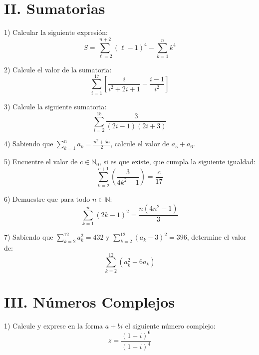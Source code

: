 \documentclass[letterpaper, 12pt]{article}
\newenvironment{ejercicios}{}{}
\begin{document}
\begin{ejercicios}
\vspace{1cm}

\newpage
\thispagestyle{fancy}
\section*{II. Sumatorias}

1) Calcular la siguiente expresión:
$$ S = \sum_{\ell=2}^{n+2} (\ell - 1)^4 - \sum_{k=1}^n k^4 $$

\vspace{0.5cm}

2) Calcule el valor de la sumatoria:
$$ \sum_{i=1}^{17} \left[ \frac{i}{i^2 + 2i + 1} - \frac{i - 1}{i^2} \right] $$

\vspace{0.5cm}

3) Calcule la siguiente sumatoria:
$$ \sum_{i=2}^{15} \frac{3}{(2i - 1)(2i + 3)} $$

\vspace{0.5cm}

4) Sabiendo que $\displaystyle \sum_{k=1}^n a_k = \frac{n^2 + 5n}{2}$, calcule el valor de $a_5 + a_6$.

\vspace{0.5cm}

5) Encuentre el valor de $c \in \mathbb{N}_0$, si es que existe, que cumpla la siguiente igualdad:
$$ \sum_{k=2}^{c+1} \left( \frac{3}{4k^2 - 1} \right) = \frac{c}{17} $$

\vspace{0.5cm}

6) Demuestre que para todo $n \in \mathbb{N}$:
$$ \sum_{k=1}^n (2k - 1)^2 = \frac{n(4n^2 - 1)}{3} $$

\vspace{0.5cm}

7) Sabiendo que
$\displaystyle \sum_{k=2}^{12}a_k^2=432$ y
$\displaystyle \sum_{k=2}^{12}(a_k-3)^2=396$, determine el valor de:
$$ \sum_{k=2}^{12} (a_k^2 - 6a_k) $$

\vspace{1cm}

\section*{III. Números Complejos}

1) Calcule y exprese en la forma $a+bi$ el siguiente número complejo:
$$ z = \frac{(1+i)^6}{(1-i)^4} $$
 
\vspace{0.5cm}
 

\end{ejercicios}
\end{document}
